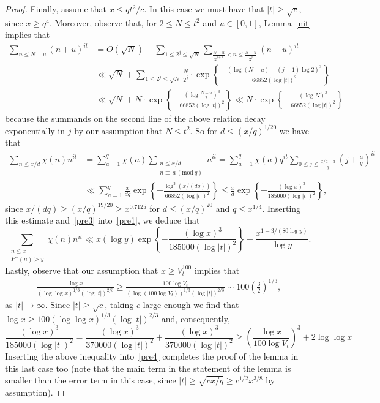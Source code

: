 \documentclass[12pt]{amsart}
\theoremstyle{remark}
\newcommand{\bsp}{\begin{split}}
\newcommand{\be}{\begin{equation}}
\newcommand{\ee}{\end{equation}}
\newcommand{\bes}{\begin{equation*}}
\newcommand{\ees}{\end{equation*}}
\numberwithin{equation}{section}
\begin{document}
\begin{proof}
Finally, assume that $x\le qt^2/c$. In this case we must have that $|t|\ge\sqrt{c}$, since $x\ge q^4$. Moreover, observe that, for $2\le N\le t^2$ and $u\in[0,1]$, Lemma~\ref{nit} implies that
\begin{align*}
\sum_{n\le N-u}(n+u)^{it} &= O(\sqrt{N})+\sum_{1\le2^j\le\sqrt{N}} \sum_{\frac{N-u}{2^{j+1}}<n\le\frac{N-u}{2^j} }(n+u)^{it} \\
&\ll \sqrt{N} +\sum_{1\le2^j\le\sqrt{N}} \frac{N}{2^j} \cdot \exp\left\{ -  \frac{(\log(N-u)-(j+1)\log 2)^3}{66852(\log|t|)^2} \right\} \\
&\ll \sqrt{N} + N \cdot \exp\left\{ -  \frac{\left(\log\frac{N-u}2\right)^3}{66852(\log|t|)^2} \right\} \ll N \cdot \exp\left\{ -  \frac{(\log N)^3}{66852(\log|t|)^2} \right\}
\end{align*}
because the summands on the second line of the above relation decay exponentially in $j$ by our assumption that $N\le t^2$. So for $d\le(x/q)^{1/20}$ we have that
\bes\bsp
\sum_{n\le x/d}\chi(n)n^{it} &=\sum_{a=1}^{q}\chi(a)\sum_{\substack{n\le x/d\\n\equiv\,a\,(\text{mod}\ q)}}n^{it}
=\sum_{a=1}^q\chi(a)q^{it}\sum_{0\le j\le\frac{x/d-a}q}\left(j+\frac aq\right)^{it} \\
&\ll\sum_{a=1}^q \frac x{dq}\exp\left\{-\frac{\log^3(x/(dq))}{66852(\log|t|)^2}\right\} \le \frac xd \exp\left\{-\frac{(\log x)^3}{185000(\log |t|)^2}\right\},\end{split}\ees since $x/(dq)\ge(x/q)^{19/20}\ge x^{0.7125}$ for $d\le(x/q)^{20}$ and $q\le x^{1/4}$. Inserting this estimate and~\eqref{pre3} into~\eqref{pre1}, we deduce that
\be\label{pre4}
\sum_{\substack{n\le x\\P^-(n)>y}}\chi(n)n^{it}\ll x(\log y)\exp\left\{-\frac{(\log x)^3}{185000(\log |t|)^2}\right\} + \frac{x^{1-3/(80\log y)}}{\log y}.
\ee
Lastly, observe that our assumption that $x\ge V_t^{100}$ implies that
\begin{align*}
\frac{\log x}{(\log\log x)^{1/3}(\log |t|)^{2/3}}\ge\frac{100\log V_t}{(\log(100\log V_t))^{1/3}(\log |t|)^{2/3}} \sim100\left(\frac32\right)^{1/3},
\end{align*} as $|t|\to\infty$. Since $|t|\ge\sqrt{c}$, taking $c$ large enough we find that
$\log x\ge100(\log\log x)^{1/3}(\log|t|)^{2/3}$ and, consequently,
\[
\frac{ (\log x)^3} { 185000 (\log |t|)^2}
    = \frac{ (\log x)^3} { 370000 (\log |t|)^2}
        + \frac{ (\log x)^3} { 370000 (\log |t|)^2}
    \ge \left( \frac{ \log x }  { 100\log V_t }\right)^3     + 2\log\log x
\]
Inserting the above inequality into~\eqref{pre4} completes the proof of the lemma in this last case too (note that the main term in the statement of the lemma is smaller than the error term in this case, since $|t|\ge\sqrt{cx/q}\ge c^{1/2}x^{3/8}$ by assumption).
\end{proof}
\end{document}
